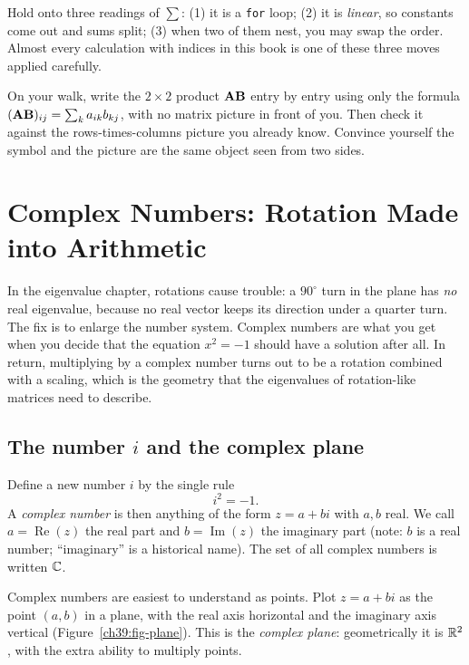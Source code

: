 \begin{focusbox}
Hold onto three readings of $\sum$: (1) it is a \texttt{for} loop; (2) it is \emph{linear}, so
constants come out and sums split; (3) when two of them nest, you may swap the order. Almost every
calculation with indices in this book is one of these three moves applied carefully.
\end{focusbox}

\begin{walkbox}
On your walk, write the $2\times 2$ product $\mathbf{A}\mathbf{B}$ entry by entry using only the formula
$(\mathbf{A}\mathbf{B})_{ij} = \sum_k a_{ik}b_{kj}$, with no matrix picture in front of you. Then check it
against the rows-times-columns picture you already know. Convince yourself the symbol and the picture
are the same object seen from two sides.
\end{walkbox}

\section{Complex Numbers: Rotation Made into Arithmetic}
\label{ch39:complex}

In the eigenvalue chapter, rotations cause trouble: a $90^\circ$ turn in the plane has \emph{no} real
eigenvalue, because no real vector keeps its direction under a quarter turn. The fix is to enlarge
the number system. Complex numbers are what you get when you decide that the equation $x^2 = -1$
should have a solution after all. In return, multiplying by a complex number turns out to be a
rotation combined with a scaling, which is the geometry that the eigenvalues of rotation-like
matrices need to describe.

\subsection{The number $i$ and the complex plane}
\label{ch39:i}

Define a new number $i$ by the single rule
\[
i^2 = -1.
\]
A \emph{complex number} is then anything of the form $z = a + bi$ with $a, b$ real. We call $a =
\operatorname{Re}(z)$ the real part and $b = \operatorname{Im}(z)$ the imaginary part (note: $b$ is a
real number; ``imaginary'' is a historical name). The set of all complex numbers is written $\mathbb{C}$.

Complex numbers are easiest to understand as points. Plot $z = a + bi$ as the point $(a,b)$ in a
plane, with the real axis horizontal and the imaginary axis vertical
(Figure~\ref{ch39:fig-plane}). This is the \emph{complex plane}: geometrically it is $\mathbb{R}^2$, with
the extra ability to multiply points.

